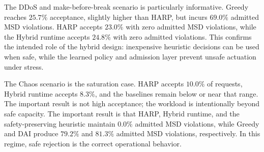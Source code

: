 \documentclass[final,5p]{elsarticle}
\begin{document}
\begin{table}[t]
\centering
\caption{Hardware-in-the-loop testbed results: acceptance rate / admitted MSD violation rate.}
\label{tab:testbed_results}
\renewcommand{\arraystretch}{1.08}
\setlength{\tabcolsep}{2pt}
\scriptsize
{}
\end{table}

The DDoS and make-before-break scenario is particularly informative. Greedy reaches \(25.7\%\) acceptance, slightly higher than HARP, but incurs \(69.0\%\) admitted MSD violations. HARP accepts \(23.0\%\) with zero admitted MSD violations, while the Hybrid runtime accepts \(24.8\%\) with zero admitted violations. This confirms the intended role of the hybrid design: inexpensive heuristic decisions can be used when safe, while the learned policy and admission layer prevent unsafe actuation under stress.

The Chaos scenario is the saturation case. HARP accepts \(10.0\%\) of requests, Hybrid runtime accepts \(8.3\%\), and the baselines remain below or near that range. The important result is not high acceptance; the workload is intentionally beyond safe capacity. The important result is that HARP, Hybrid runtime, and the safety-preserving heuristic maintain \(0.0\%\) admitted MSD violations, while Greedy and DAI produce \(79.2\%\) and \(81.3\%\) admitted MSD violations, respectively. In this regime, safe rejection is the correct operational behavior.
\end{document}
